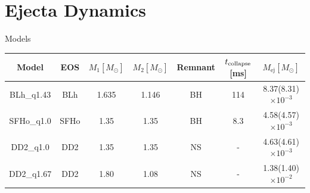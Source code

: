 \section{Ejecta Dynamics}


\begin{frame}{Models}


\begin{tabular}{c| c| c| c| c| c| c}
\hline\hline
Model & EOS & $M_{1}[M_{\odot}]$ & $M_{2}[M_{\odot}]$ & Remnant & $t_{\rm collapse}$ [ms]& $M_{\mathrm{ej}}[M_{\odot}]$   \\
\hline\hline
BLh\_q1.43 & BLh  & 1.635 & 1.146 & BH & 114  &  8.37(8.31)$\times 10^{-3}$ \\
\hline
SFHo\_q1.0 & SFHo & 1.35  & 1.35  & BH & 8.3  &  4.58(4.57)$\times 10^{-3}$ \\
\hline
DD2\_q1.0  & DD2  & 1.35  & 1.35  & NS & -      & 4.63(4.61)$\times 10^{-3}$\\
\hline
DD2\_q1.67 & DD2  & 1.80  & 1.08  & NS & -     & 1.38(1.40)$\times 10^{-2}$\\
\hline\hline
\end{tabular}

\end{frame}


